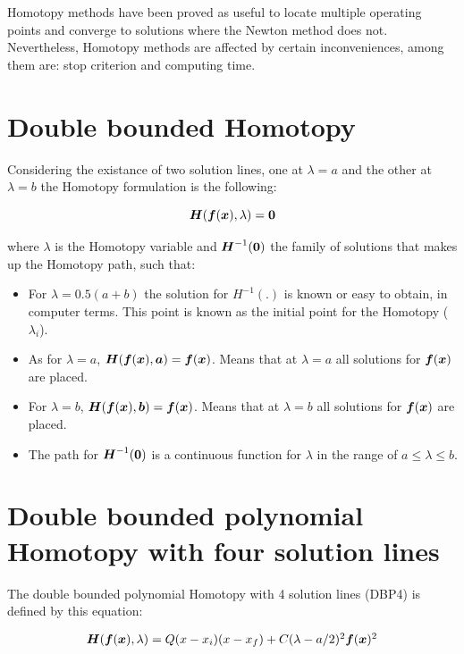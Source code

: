\documentclass[conference,letterpaper,onecolumn]{IEEEtran}
\newcommand{\pig}[1]{\mbox{\boldmath ${#1}$}	}
\begin{document}
Homotopy methods \cite{BHLHOM,homo_ushida1,homo_green2,homo_DWolfMulti,homo_ArtificialP} have been proved as useful to locate multiple operating points and converge to solutions where the Newton method does not. Nevertheless, Homotopy methods are affected by certain inconveniences, among them are: stop criterion and computing time.

\section{Double bounded Homotopy}

Considering the existance of two solution lines, one at $\lambda=a$ and the other at $\lambda=b$ the Homotopy formulation is the following:

\begin{equation}
\pig{H}(\pig{f}(\pig{x}),\lambda ) =\pig{0}
\label{H2M}
\end{equation}

where $\lambda$ is the Homotopy variable and $\pig{H}^{-1}(\pig{0})$ the family of solutions that makes up the Homotopy path, such that:

\begin{itemize}
\item For $\lambda=0.5(a+b)$ the solution for $H^{-1}(.)$ is known
or easy to obtain, in computer terms. This point is known as the initial point for the Homotopy  ($\lambda_i$).
\item As for $\lambda=a$, $\pig{H}(\pig{f}(\pig{x}),\pig{a} )=\pig{f}(\pig{x})$.
Means that at $\lambda=a$ all solutions for $\pig{f}(\pig{x})$ are placed.
\item For $\lambda=b$, $\pig{H}(\pig{f}(\pig{x}),\pig{b} )=\pig{f}(\pig{x})$.
Means that at $\lambda=b$ all solutions for $\pig{f}(\pig{x})$ are placed.
\item The path for $\pig{H}^{-1}(\pig{0})$ is a continuous function for $\lambda$ in the range of  $a \leq \lambda \leq b $. 
\end{itemize}

\section{Double bounded polynomial Homotopy with four solution lines}

The double bounded polynomial Homotopy with 4 solution lines (DBP4) is defined by this equation:

\begin{equation}
{\small
\begin{array}{l}
\pig{H}(\pig{f}(\pig{x}),\lambda )=Q(x-x_i)(x-x_f) +C(\lambda-a/2)^2 \pig{f}(\pig{x})^2
\end{array}}
\label{homotopiaP}
\end{equation}
\end{document}

